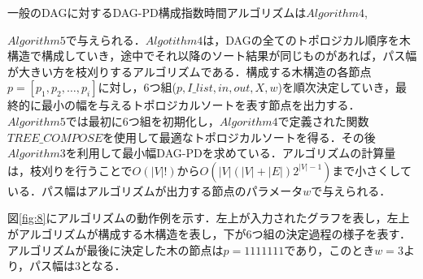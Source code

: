 \documentclass{kuisthesis}           %
\begin{document}
 一般のDAGに対するDAG-PD構成指数時間アルゴリズムは$Algorithm 4$, \par $Algorithm5$で与えられる．$Algotithm4$は，DAGの全てのトポロジカル順序を木構造で構成していき，途中でそれ以降のソート結果が同じものがあれば，パス幅が大きい方を枝刈りするアルゴリズムである．構成する木構造の各節点$p=[p_1, p_2,   \ldots, p_i]$に対し，6つ組($p, I\_list, in, out, X, w$)を順次決定していき，最終的に最小の幅を与えるトポロジカルソートを表す節点を出力する．$Algorithm5$では最初に6つ組を初期化し，$Algorithm4$で定義された関数$TREE\_COMPOSE$を使用して最適なトポロジカルソートを得る．その後$Algorithm3$を利用して最小幅DAG-PDを求めている．アルゴリズムの計算量は，枝刈りを行うことで$O(|V|!)$から$O(|V|(|V|+|E|)2^{|V|-1})$まで小さくしている．パス幅はアルゴリズムが出力する節点のパラメータ$w$で与えられる．

 図\ref{fig:8}にアルゴリズムの動作例を示す．左上が入力されたグラフを表し，左上がアルゴリズムが構成する木構造を表し，下が6つ組の決定過程の様子を表す．アルゴリズムが最後に決定した木の節点は$p=1111111$であり，このとき$w=3$より，パス幅は3となる．
\end{document}
